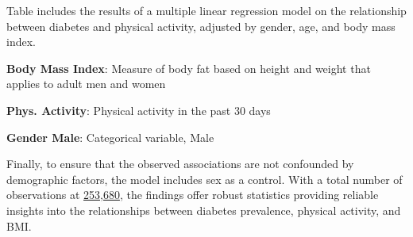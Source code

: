 \documentclass[11pt]{article}
\begin{document}
\begin{table}[h]
\caption{\protect\hyperlink{file-table-1-pkl}{Multiple Linear Regression for Testing Association between Physical Activity Level and Diabetes, Adjusted by Age, Gender, and Body Mass Index}}
\label{table:LinearRegression}
\begin{threeparttable}
\renewcommand{\TPTminimum}{\linewidth}
\begin{tablenotes}
\footnotesize
\item Table includes the results of a multiple linear regression model on the relationship between diabetes and physical activity, adjusted by gender, age, and body mass index.
\item \textbf{Body Mass Index}: Measure of body fat based on height and weight that applies to adult men and women
\item \textbf{Phys. Activity}: Physical activity in the past 30 days
\item \textbf{Gender Male}: Categorical variable, Male
\end{tablenotes}
\end{threeparttable}
\end{table}


Finally, to ensure that the observed associations are not confounded by demographic factors, the model includes sex as a control. With a total number of observations at \hyperlink{R0a}{253,680}, the findings offer robust statistics providing reliable insights into the relationships between diabetes prevalence, physical activity, and BMI.
\end{document}
